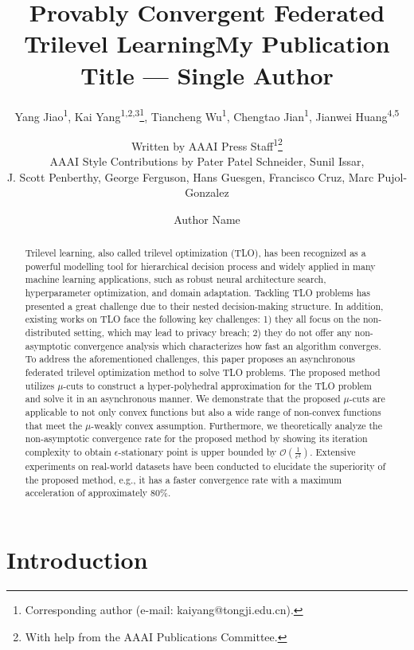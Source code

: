 \documentclass[letterpaper]{article} %
\title{Provably Convergent Federated Trilevel Learning}
\author {
Yang Jiao\textsuperscript{\rm 1},
Kai Yang\textsuperscript{\rm 1,2,3}\thanks{Corresponding author (e-mail: kaiyang@tongji.edu.cn).},
Tiancheng Wu\textsuperscript{\rm 1},
Chengtao Jian\textsuperscript{\rm 1},
Jianwei Huang\textsuperscript{\rm 4,5}
}
\author{
Written by AAAI Press Staff\textsuperscript{\rm 1}\thanks{With help from the AAAI Publications Committee.}\\
AAAI Style Contributions by Pater Patel Schneider,
Sunil Issar,\\
J. Scott Penberthy,
George Ferguson,
Hans Guesgen,
Francisco Cruz\equalcontrib,
Marc Pujol-Gonzalez\equalcontrib
}
\title{My Publication Title --- Single Author}
\author {
Author Name
}
\begin{document}
\maketitle

\begin{abstract}
Trilevel learning, also called trilevel optimization (TLO), has been recognized as a powerful modelling tool for hierarchical decision process and widely applied in many machine learning applications, such as robust neural architecture search, hyperparameter optimization, and domain adaptation. Tackling TLO problems has presented a great challenge due to their nested decision-making structure. In addition, existing works on TLO face the following key challenges: 1) they all focus on the non-distributed setting, which may lead to privacy breach; 2) they do not offer any non-asymptotic convergence analysis which characterizes how fast an algorithm converges. To address the aforementioned challenges, this paper proposes an asynchronous federated trilevel optimization method to solve TLO problems. The proposed method utilizes $\mu$-cuts to construct a hyper-polyhedral approximation for the TLO problem and solve it in an asynchronous manner. We demonstrate that the proposed $\mu$-cuts are applicable to not only convex functions but also a wide range of non-convex functions that meet the $\mu$-weakly convex assumption. Furthermore, we theoretically analyze the non-asymptotic convergence rate for the proposed method by showing its iteration complexity to obtain $\epsilon$-stationary point is upper bounded by $\mathcal{O}(\frac{1}{\epsilon^2})$. Extensive experiments on real-world datasets have been conducted to elucidate the superiority of the proposed method, e.g., it has a  faster convergence rate with a maximum acceleration of approximately 80$\%$.

\end{abstract}

\section{Introduction}
\end{document}
